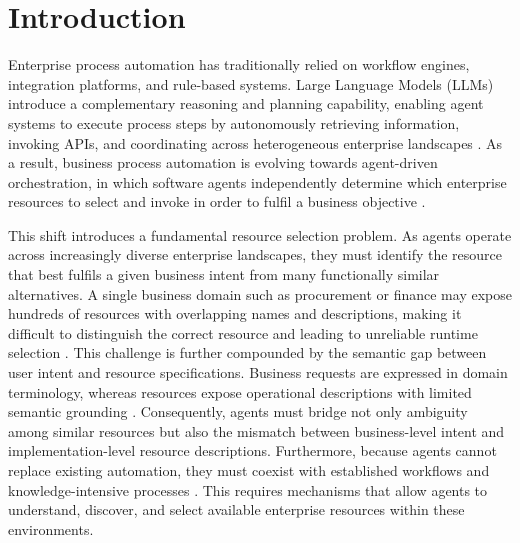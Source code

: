 \documentclass[10pt,twocolumn]{article}
\begin{document}
\section{Introduction}

Enterprise process automation has traditionally relied on workflow engines, integration platforms, and rule-based systems. Large Language Models (LLMs) introduce a complementary reasoning and planning capability, enabling agent systems to execute process steps by autonomously retrieving information, invoking APIs, and coordinating across heterogeneous enterprise landscapes \citep{xu_llm-based_2025}. As a result, business process automation is evolving towards agent-driven orchestration, in which software agents independently determine which enterprise resources to select and invoke in order to fulfil a business objective \citep{dumas_agentic_2026}.

This shift introduces a fundamental resource selection problem. As agents operate across increasingly diverse enterprise landscapes, they must identify the resource that best fulfils a given business intent from many functionally similar alternatives. A single business domain such as procurement or finance may expose hundreds of resources with overlapping names and descriptions, making it difficult to distinguish the correct resource and leading to unreliable runtime selection \citep{tang_multi-field_2026}. This challenge is further compounded by the semantic gap between user intent and resource specifications. Business requests are expressed in domain terminology, whereas resources expose operational descriptions with limited semantic grounding \citep{lu_tools_2026}. Consequently, agents must bridge not only ambiguity among similar resources but also the mismatch between business-level intent and implementation-level resource descriptions. Furthermore, because agents cannot replace existing automation, they must coexist with established workflows and knowledge-intensive processes \citep{van_der_aalst_business_2013,di_ciccio_knowledge-intensive_2015}. This requires mechanisms that allow agents to understand, discover, and select available enterprise resources within these environments.

\end{document}
